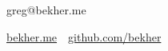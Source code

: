 
\title{\CVAuthor}

\begin{subtitle}
greg@bekher.me

\par
\href{\CVWebpage}
{bekher.me}
\,\SubBulletSymbol\,
\href{https://github.com/bekher}
{github.com/bekher}
\end{subtitle}
